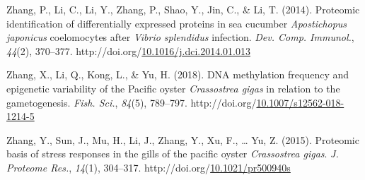 \documentclass [11pt, proquest] {uwthesis}[2015/03/03]
\newlength{\cslhangindent}
\newenvironment{CSLReferences}%
{\setlength{\parindent}{0pt}%
\everypar{\setlength{\hangindent}{\cslhangindent}}\ignorespaces}%
{\par}
\begin{document}
\begin{CSLReferences}{1}{0}
\leavevmode\hypertarget{ref-Zhang2014}{}%
Zhang, P., Li, C., Li, Y., Zhang, P., Shao, Y., Jin, C., \& Li, T. (2014). {Proteomic identification of differentially expressed proteins in sea cucumber \emph{Apostichopus japonicus} coelomocytes after \emph{Vibrio splendidus} infection}. \emph{Dev. Comp. Immunol.}, \emph{44}(2), 370--377. http://doi.org/\href{https://doi.org/10.1016/j.dci.2014.01.013}{10.1016/j.dci.2014.01.013}

\leavevmode\hypertarget{ref-Zhang2018}{}%
Zhang, X., Li, Q., Kong, L., \& Yu, H. (2018). {DNA methylation frequency and epigenetic variability of the Pacific oyster \emph{Crassostrea gigas} in relation to the gametogenesis}. \emph{Fish. Sci.}, \emph{84}(5), 789--797. http://doi.org/\href{https://doi.org/10.1007/s12562-018-1214-5}{10.1007/s12562-018-1214-5}

\leavevmode\hypertarget{ref-Zhang2015}{}%
Zhang, Y., Sun, J., Mu, H., Li, J., Zhang, Y., Xu, F., \ldots{} Yu, Z. (2015). {Proteomic basis of stress responses in the gills of the pacific oyster \emph{Crassostrea gigas}}. \emph{J. Proteome Res.}, \emph{14}(1), 304--317. http://doi.org/\href{https://doi.org/10.1021/pr500940s}{10.1021/pr500940s}

\end{CSLReferences}
\end{document}

